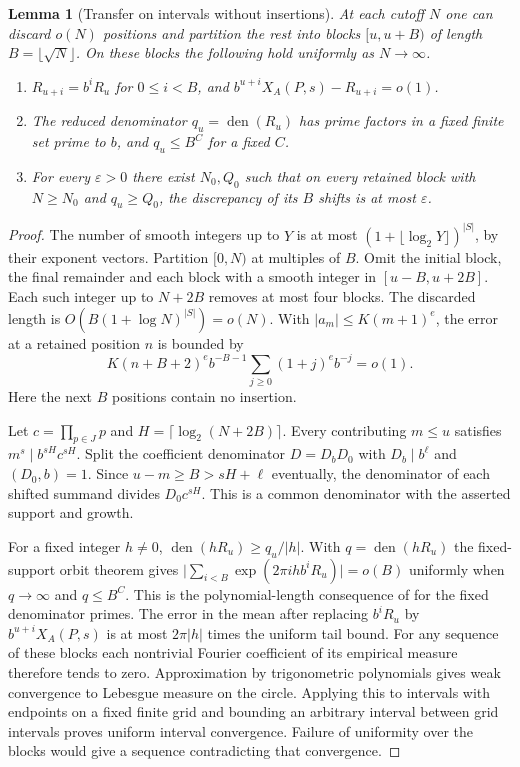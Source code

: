 \documentclass[11pt]{article}
\newtheorem{lemma}[theorem]{Lemma}
\newcommand{\den}{\operatorname{den}}
\begin{document}
\begin{lemma}[Transfer on intervals without insertions]\label{lem:transfer}
At each cutoff \(N\) one can discard \(o(N)\) positions and partition the rest into blocks \([u,u+B)\) of length \(B=\lfloor\sqrt N\rfloor\). On these blocks the following hold uniformly as \(N\to\infty\).
\begin{enumerate}
\item \(R_{u+i}=b^i R_u\) for \(0\le i<B\), and \(b^{u+i}X_A(P,s)-R_{u+i}=o(1)\).
\item The reduced denominator \(q_u=\den(R_u)\) has prime factors in a fixed finite set prime to \(b\), and \(q_u\le B^C\) for a fixed \(C\).
\item For every \(\varepsilon>0\) there exist \(N_0,Q_0\) such that on every retained block with \(N\ge N_0\) and \(q_u\ge Q_0\), the discrepancy of its \(B\) shifts is at most \(\varepsilon\).
\end{enumerate}
\end{lemma}
\begin{proof}
The number of smooth integers up to \(Y\) is at most \((1+\lfloor\log_2 Y\rfloor)^{|S|}\), by their exponent vectors. Partition \([0,N)\) at multiples of \(B\). Omit the initial block, the final remainder and each block with a smooth integer in \([u-B,u+2B]\). Each such integer up to \(N+2B\) removes at most four blocks. The discarded length is \(O(B(1+\log N)^{|S|})=o(N)\). With \(|a_m|\le K(m+1)^e\), the error at a retained position \(n\) is bounded by
\[
 K (n+B+2)^e b^{-B-1}\sum_{j\ge0}(1+j)^e b^{-j}=o(1).
\]
Here the next \(B\) positions contain no insertion.

Let \(c=\prod_{p\in J}p\) and \(H=\lceil\log_2(N+2B)\rceil\). Every contributing \(m\le u\) satisfies \(m^s\mid b^{sH}c^{sH}\). Split the coefficient denominator \(D=D_bD_0\) with \(D_b\mid b^\ell\) and \((D_0,b)=1\). Since \(u-m\ge B>sH+\ell\) eventually, the denominator of each shifted summand divides \(D_0 c^{sH}\). This is a common denominator with the asserted support and growth.

For a fixed integer \(h\ne0\), \(\den(hR_u)\ge q_u/|h|\). With \(q=\den(hR_u)\) the fixed-support orbit theorem gives
\(\big|\sum_{i<B}\exp(2\pi i h b^iR_u)\big|=o(B)\) uniformly when \(q\to\infty\) and \(q\le B^C\). This is the polynomial-length consequence of \cite[Cor.~1.2 in the preprint]{vandehey} for the fixed denominator primes. The error in the mean after replacing \(b^iR_u\) by \(b^{u+i}X_A(P,s)\) is at most \(2\pi |h|\) times the uniform tail bound. For any sequence of these blocks each nontrivial Fourier coefficient of its empirical measure therefore tends to zero. Approximation by trigonometric polynomials gives weak convergence to Lebesgue measure on the circle. Applying this to intervals with endpoints on a fixed finite grid and bounding an arbitrary interval between grid intervals proves uniform interval convergence. Failure of uniformity over the blocks would give a sequence contradicting that convergence.
\end{proof}
\end{document}
